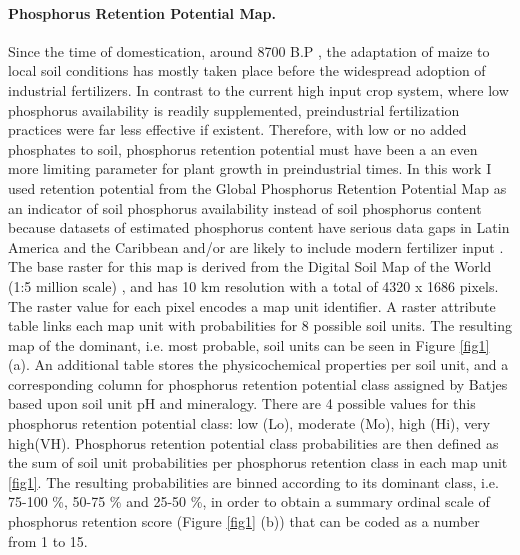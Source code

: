 \documentclass[10pt,letterpaper]{article}
\begin{document}
\paragraph{Phosphorus Retention Potential Map.} Since the time of domestication, around 8700 B.P \cite{hastorf2009}, the adaptation of maize to local soil conditions has mostly taken place before the widespread adoption of industrial fertilizers. In contrast to the current high input crop system, where low phosphorus availability is readily supplemented, preindustrial fertilization practices were far less effective if existent. Therefore, with low or no added phosphates to soil, phosphorus retention potential must have been a an even more limiting parameter for plant growth in preindustrial times. In this work I used retention potential from the Global Phosphorus Retention Potential Map \cite{batjes2011} as an indicator of soil phosphorus availability instead of soil phosphorus content because datasets of estimated phosphorus content have serious data gaps in Latin America and the Caribbean and/or are likely to include modern fertilizer input \cite{shangguan2014, yang2013, harvestchoice2010, sanchez2003}. 
The base raster for this map is derived from the Digital Soil Map of the World (1:5 million scale) \cite{fao1974a, fao1995}, and has 10 km resolution with a total of 4320 x 1686 pixels. The raster value for each pixel encodes a map unit identifier. A raster attribute table links each map unit with probabilities for 8 possible soil units. The resulting map of the dominant, i.e. most probable, soil units can be seen in Figure \ref{fig1} (a). An additional table stores the physicochemical properties per soil unit, and a corresponding column for phosphorus retention potential class assigned by Batjes based upon soil unit pH and mineralogy. There are 4 possible values for this phosphorus retention potential class: low (Lo), moderate (Mo), high (Hi), very high(VH). Phosphorus retention potential class probabilities are then defined as the sum of soil unit probabilities per phosphorus retention class in each map unit \ref{fig1}. The resulting probabilities are binned according to its dominant class, i.e. 75-100 \%, 50-75 \% and 25-50 \%, in order to obtain a summary ordinal scale of phosphorus retention score (Figure \ref{fig1} (b)) that can be coded as a number from 1 to 15. 
\end{document}
